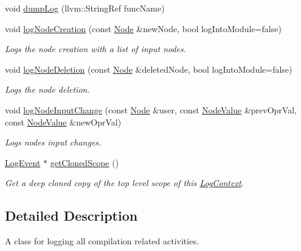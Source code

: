 \begin{DoxyCompactItemize}
void \hyperlink{classglow_1_1_log_context_a72bcf17196ebe196cc7069f6b53d8489}{dump\+Log} (llvm\+::\+String\+Ref func\+Name)
\item 
void \hyperlink{classglow_1_1_log_context_acf1c637611e33d3677d943bd89c240d1}{log\+Node\+Creation} (const \hyperlink{classglow_1_1_node}{Node} \&new\+Node, bool log\+Into\+Module=false)
\begin{DoxyCompactList}\small\item\em Logs the node creation with a list of input nodes. \end{DoxyCompactList}\item 
void \hyperlink{classglow_1_1_log_context_aa50d06ca59c680f4faa4339644584226}{log\+Node\+Deletion} (const \hyperlink{classglow_1_1_node}{Node} \&deleted\+Node, bool log\+Into\+Module=false)
\begin{DoxyCompactList}\small\item\em Logs the node deletion. \end{DoxyCompactList}\item 
void \hyperlink{classglow_1_1_log_context_a03bfee023d7c01e3c1a3701a56fbe0c6}{log\+Node\+Input\+Change} (const \hyperlink{classglow_1_1_node}{Node} \&user, const \hyperlink{structglow_1_1_node_value}{Node\+Value} \&prev\+Opr\+Val, const \hyperlink{structglow_1_1_node_value}{Node\+Value} \&new\+Opr\+Val)
\begin{DoxyCompactList}\small\item\em Logs node\textquotesingle{}s input changes. \end{DoxyCompactList}\item 
\mbox{\label{classglow_1_1_log_context_ae9827db3c15f81408249624889b423fc}} 
\hyperlink{structglow_1_1_log_event}{Log\+Event} $\ast$ \hyperlink{classglow_1_1_log_context_ae9827db3c15f81408249624889b423fc}{get\+Cloned\+Scope} ()
\begin{DoxyCompactList}\small\item\em Get a deep cloned copy of the top level scope of this \hyperlink{classglow_1_1_log_context}{Log\+Context}. \end{DoxyCompactList}\end{DoxyCompactItemize}


\subsection{Detailed Description}
A class for logging all compilation related activities. 

